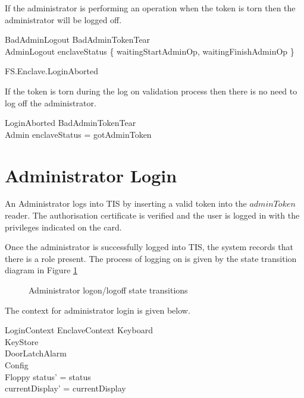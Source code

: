 If the administrator is performing an operation when the token is torn
then the administrator will be logged off.

\begin{schema}{BadAdminLogout}
        BadAdminTokenTear
\\      AdminLogout
\where
        enclaveStatus \in \{ waitingStartAdminOp, waitingFinishAdminOp
        \}
\end{schema}


\begin{traceunit}{FS.Enclave.LoginAborted}
\end{traceunit}

If the token is torn during the log on validation process then there
is no need to log off the administrator.

\begin{schema}{LoginAborted}
        BadAdminTokenTear
\\      \Xi Admin
\where
        enclaveStatus = gotAdminToken
\end{schema}


\section{Administrator Login}


An Administrator logs into TIS by inserting a valid token
into the $adminToken$ reader. The authorisation certificate is
verified and the user is logged in with the privileges indicated on
the card.

Once the administrator is successfully logged into TIS, the system
records that there is a role present. The process of logging on is
given by the state transition diagram in Figure \ref{fig:logon}

\begin{figure}[htbp]
  \begin{center}
    \leavevmode
    \caption{Administrator logon/logoff state transitions}
    \label{fig:logon}
  \end{center}
\end{figure}

The context for administrator login is given below.

\begin{schema}{LoginContext}
        EnclaveContext
\also
        \Xi Keyboard
\\      \Xi KeyStore
\\      \Xi DoorLatchAlarm
\\      \Xi Config
\\      \Xi Floppy
\where
        status' = status
\\      currentDisplay' = currentDisplay
\end{schema}


